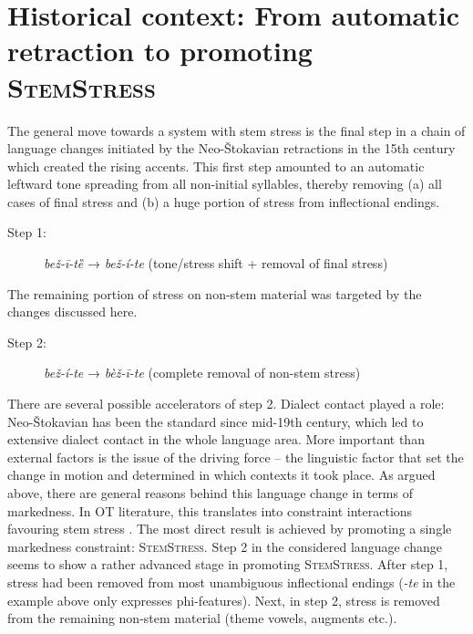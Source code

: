 \documentclass[output=paper,modfonts,nonflat
]{langsci/langscibook}
\begin{document}
\section{Historical context: From automatic retraction to promoting \textsc{StemStress}} \label{sec:kager:5}

The general move towards a system with stem stress is the final step in a chain of language changes initiated by the Neo-Štokavian retractions in the 15th century \citep[162--168]{Bethin2006} which created the rising accents. This first step amounted to an automatic leftward tone spreading from all non-initial syllables, thereby removing (a) all cases of final stress and (b) a huge portion of stress from inflectional endings. 
\begin{description}
    \item[Step 1:] \textit{bež-ī-tȅ} → \textit{bež-í-te} (tone/stress shift + removal of final stress)
\end{description}

\noindent The remaining portion of stress on non-stem material was targeted by the changes discussed here.

\begin{description}
    \item[Step 2:] \textit{bež-í-te} → \textit{bèž-ī-te}  (complete removal of non-stem stress)
\end{description}

\noindent There are several possible accelerators of step 2. Dialect contact played a role: Neo-Štokavian has been the standard since mid-19th century, which led to extensive dialect contact in the whole language area. More important than external factors is the issue of the driving force – the linguistic factor that set the change in motion and determined in which contexts it took place. As argued above, there are general reasons behind this language change in terms of markedness. In OT literature, this translates into constraint interactions favouring stem stress \citep[e.g.][]{Revithiadou1999, Alderete2001, Kager2000}. The most direct result is achieved by promoting a single markedness constraint: \textsc{StemStress}. 
Step 2 in the considered language change seems to show a rather advanced stage in promoting \textsc{StemStress}. After step 1, stress had been removed from most unambiguous inflectional endings (\textit{-te} in the example above only expresses phi-features). Next, in step 2, stress is removed from the remaining non-stem material (theme vowels, augments etc.).
\end{document}
